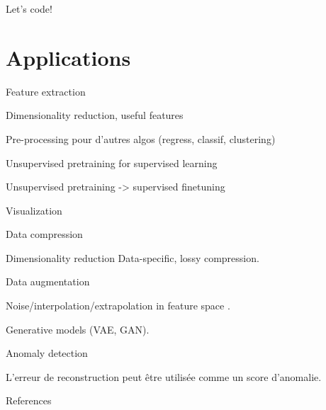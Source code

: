 \documentclass{beamer}
\begin{document}
  \begin{frame}{Let's code!}

    
  \end{frame}

  \section{Applications}

  \begin{frame}{Feature extraction}

    Dimensionality reduction, useful features

    Pre-processing pour d'autres algos (regress, classif, clustering)
    
  \end{frame}

  \begin{frame}{Unsupervised pretraining for supervised learning}
    
    Unsupervised pretraining -> supervised finetuning

    \cite{Erhan2010}

  \end{frame}

  \begin{frame}{Visualization}
    
  \end{frame}

  \begin{frame}{Data compression}
    
    Dimensionality reduction
    Data-specific, lossy compression.

  \end{frame}  

  \begin{frame}{Data augmentation}

    Noise/interpolation/extrapolation in feature space \cite{Devries2017}.

    Generative models (VAE, GAN).

  \end{frame}

  \begin{frame}{Anomaly detection}
    
    L'erreur de reconstruction peut être utilisée comme un score d'anomalie.

  \end{frame}

  \appendix

  \begin{frame}[allowframebreaks]{References}
    
    
    
  
  \end{frame}
\end{document}
